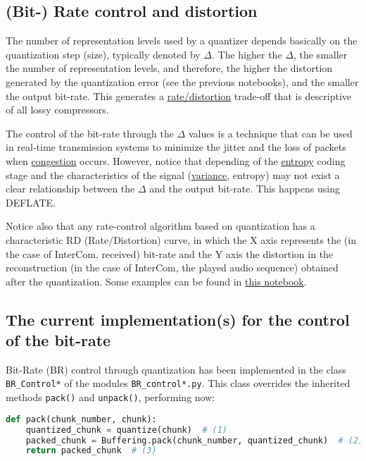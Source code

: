 
\subsection{(Bit-) Rate control and distortion}
The number of representation levels used by a quantizer depends
basically on the quantization step (size), typically denoted
by $\Delta$. The higher the $\Delta$, the smaller the number of
representation levels, and therefore, the higher the distortion
generated by the quantization error (see the previous notebooks), and
the smaller the output bit-rate. This generates a
\href{https://en.wikipedia.org/wiki/Rate%E2%80%93distortion_theory}{rate/distortion}
  trade-off that is descriptive of all lossy compressors.

The control of the bit-rate through the $\Delta$ values is a technique
that can be used in real-time transmission systems to minimize the
jitter and the loss of packets when
\href{https://en.wikipedia.org/wiki/Network_congestion}{congestion}
occurs. However, notice that depending of the
\href{https://en.wikipedia.org/wiki/Entropy_(information_theory)}{entropy}
coding stage and the characteristics of the signal
(\href{https://en.wikipedia.org/wiki/Variance}{variance}, entropy) may
not exist a clear relationship between the $\Delta$ and the output
bit-rate. This happens using DEFLATE.

Notice also that any rate-control algorithm based on quantization has a
characteristic RD (Rate/Distortion) curve, in which the X axis
represents the (in the case of InterCom, received) bit-rate and the Y
axis the distortion in the reconstruction (in the case of InterCom,
the played audio sequence) obtained after the quantization. Some
examples can be found
in \href{https://github.com/Tecnologias-multimedia/Tecnologias-multimedia.github.io/blob/master/study_guide/BR_control/audio_quantization.ipynb}{this
notebook}.

\subsection{The current implementation(s) for the control of the bit-rate}
Bit-Rate (BR) control through quantization has been implemented in the
class \verb|BR_Control*| of the modules \texttt{BR\_control*.py}. This
class overrides the inherited methods \verb|pack()| and
\verb|unpack()|, performing now:

\begin{lstlisting}[language=Python]
  def pack(chunk_number, chunk):
    quantized_chunk = quantize(chunk)  # (1)
    packed_chunk = Buffering.pack(chunk_number, quantized_chunk)  # (2)
    return packed_chunk  # (3)
\end{lstlisting}

